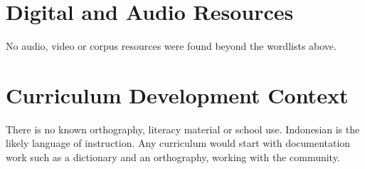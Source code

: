 \documentclass[12pt]{article}
\begin{document}
\section{Digital and Audio Resources}
No audio, video or corpus resources were found beyond the wordlists above.

\section{Curriculum Development Context}
There is no known orthography, literacy material or school use. Indonesian is the likely language of instruction. Any curriculum would start with documentation work such as a dictionary and an orthography, working with the community.
\end{document}
